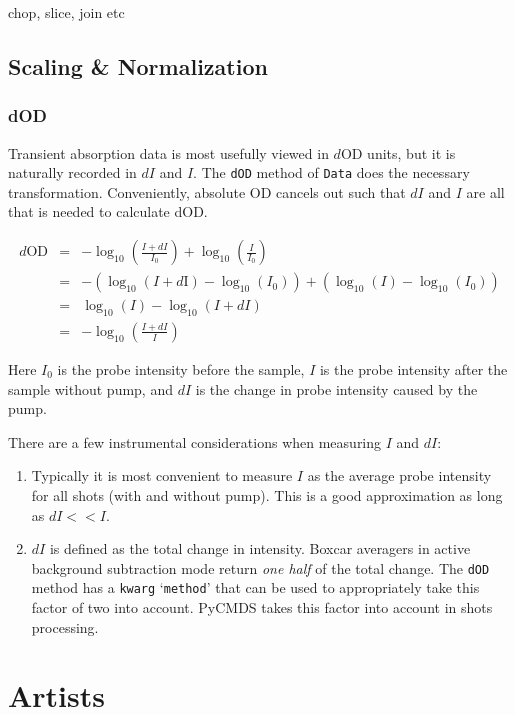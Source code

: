 \documentclass[11pt]{article}
\begin{document}
chop, slice, join etc

\subsection{Scaling \& Normalization}

\subsubsection{dOD}

Transient absorption data is most usefully viewed in $d$OD units, but it is naturally recorded in $dI$ and $I$. The \texttt{dOD} method of \texttt{Data} does the necessary transformation. Conveniently, absolute OD cancels out such that $dI$ and $I$ are all that is needed to calculate dOD.

\begin{eqnarray}
	d\mathrm{OD} &=& -\log_{10}\left(\frac{I+dI}{I_0}\right) +  \log_{10}\left(\frac{I}{I_0}\right)\\
	&=& -\left(\log_{10}(I+d\mathrm{I})-\log_{10}(I_0)\right)+\left(\log_{10}(I)-\log_{10}(I_0)\right) \\
	&=& \log_{10}(I)-\log_{10}(I+dI) \\
	&=& -\log_{10}\left(\frac{I+dI}{I}\right)
\end{eqnarray}

Here $I_0$ is the probe intensity before the sample, $I$ is the probe intensity after the sample without pump, and $dI$ is the change in probe intensity caused by the pump.

There are a few instrumental considerations when measuring $I$ and $dI$:
\begin{enumerate}
	\item Typically it is most convenient to measure $I$ as the average probe intensity for all shots (with and without pump). This is a good approximation as long as $dI<<I$.
	\item $dI$ is defined as the total change in intensity. Boxcar averagers in active background subtraction mode return \textit{one half} of the total change. The \texttt{dOD} method has a \texttt{kwarg} `\texttt{method}' that can be used to appropriately take this factor of two into account. PyCMDS takes this factor into account in shots processing.
\end{enumerate}






\pagebreak
\section{Artists}
\end{document}
